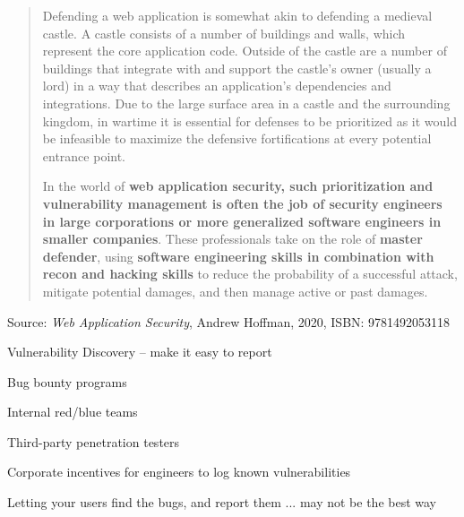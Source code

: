 \documentclass[Screen16to9,17pt]{foils}
\begin{document}
\begin{quote}\small
Defending a web application is somewhat akin to defending a medieval castle. A castle consists of a number of buildings and walls, which represent the core application code. Outside of the castle are a number of buildings that integrate with and support the castle’s owner (usually a lord) in a way that describes an application’s dependencies and integrations. Due to the large surface area in a castle and the surrounding kingdom, in wartime it is essential for defenses to be prioritized as it would be infeasible to maximize the defensive fortifications at every potential entrance point.

In the world of {\bf web application security, such prioritization and vulnerability management is often the job of security engineers in large corporations or more generalized software engineers in smaller companies}. These professionals take on the role of {\bf master defender}, using {\bf software engineering skills in combination with recon and hacking skills} to reduce the probability of a successful attack, mitigate potential damages, and then manage active or past damages.
\end{quote}
Source: \emph{Web Application Security}, Andrew Hoffman, 2020, ISBN: 9781492053118

\begin{list2}
\item Vulnerability Discovery -- make it easy to report\\
\end{list2}




\begin{list2}
\item Bug bounty programs
\item Internal red/blue teams
\item Third-party penetration testers
\item Corporate incentives for engineers to log known vulnerabilities
\item Letting your users find the bugs, and report them ... may not be the best way
\end{list2}


\end{document}
